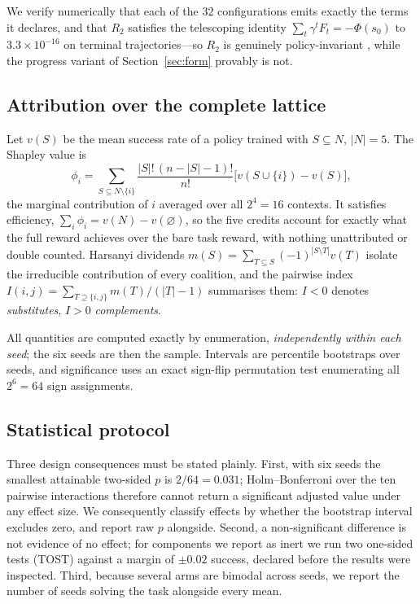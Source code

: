\documentclass[conference]{IEEEtran}
\begin{document}
We verify numerically that each of the $32$ configurations emits exactly the
terms it declares, and that $R_2$ satisfies the telescoping identity
$\sum_t\gamma^tF_t=-\Phi(s_0)$ to $3.3\times10^{-16}$ on terminal
trajectories---so $R_2$ is genuinely policy-invariant \cite{ng1999policy}, while
the progress variant of Section~\ref{sec:form} provably is not.

\subsection{Attribution over the complete lattice}
Let $v(S)$ be the mean success rate of a policy trained with $S\subseteq N$,
$|N|=5$. The Shapley value is
\begin{equation}
\phi_i=\sum_{S\subseteq N\setminus\{i\}}
\frac{|S|!\,(n-|S|-1)!}{n!}\big[v(S\cup\{i\})-v(S)\big],
\label{eq:shapley}
\end{equation}
the marginal contribution of $i$ averaged over all $2^4=16$ contexts. It
satisfies efficiency, $\sum_i\phi_i=v(N)-v(\varnothing)$, so the five credits
account for exactly what the full reward achieves over the bare task reward, with
nothing unattributed or double counted. Harsanyi dividends
$m(S)=\sum_{T\subseteq S}(-1)^{|S\setminus T|}v(T)$ isolate the irreducible
contribution of every coalition, and the pairwise index
$I(i,j)=\sum_{T\supseteq\{i,j\}}m(T)/(|T|-1)$ summarises them: $I<0$ denotes
\emph{substitutes}, $I>0$ \emph{complements}.

All quantities are computed exactly by enumeration, \emph{independently within
each seed}; the six seeds are then the sample. Intervals are percentile
bootstraps over seeds, and significance uses an exact sign-flip permutation test
enumerating all $2^6=64$ sign assignments.

\subsection{Statistical protocol}
\label{sec:stats}
Three design consequences must be stated plainly. First, with six seeds the
smallest attainable two-sided $p$ is $2/64=0.031$; Holm--Bonferroni over the ten
pairwise interactions therefore cannot return a significant adjusted value under
any effect size. We consequently classify effects by whether the bootstrap
interval excludes zero, and report raw $p$ alongside. Second, a non-significant
difference is not evidence of no effect; for components we report as inert we run
two one-sided tests (TOST) \cite{lakens2017equivalence} against a margin of
$\pm0.02$ success, declared before the results were inspected. Third, because
several arms are bimodal across seeds, we report the number of seeds solving the
task alongside every mean.
\end{document}
